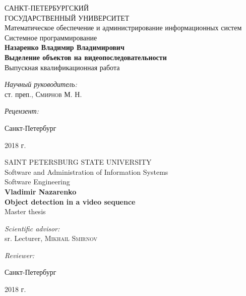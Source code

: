 \documentclass[aps,%
14pt,%
final,%
oneside,
onecolumn,%
musixtex, %
superscriptaddress,%
centertags]{extarticle} %
\begin{document}
\begin{titlepage} 
\begin{center}
{\large САНКТ-ПЕТЕРБУРГСКИЙ \\ ГОСУДАРСТВЕННЫЙ УНИВЕРСИТЕТ} \\[1.0cm]
{\large Математическое обеспечение и администрирование информационных систем} \\[0.2cm]
{\large Системное программирование} \\[3.5cm]
 
\textbf{\Large Назаренко Владимир Владимирович} \\[1cm]
\textbf{\LARGE Выделение объектов на видеопоследовательности}\\[1.0cm]
{\Large Выпускная квалификационная работа} \\[3.5cm]

\begin{flushright} \large
\emph{Научный руководитель:} \\
ст. преп., \textsc{Смирнов М. Н.}
\end{flushright}
 \begin{flushright} \large
\emph{Рецензент:} \\

\end{flushright}
\vfill 

{\large {Санкт-Петербург}} \par
{\large {2018 г.}}
\end{center} 
\end{titlepage}

\begin{titlepage} 
\begin{center}
{\large SAINT PETERSBURG STATE UNIVERSITY} \\[1.0cm]
{\large Software and Administration of Information Systems} \\[0.2cm]
{\large Software Engineering} \\[3.5cm]
 
\textbf{\Large Vladimir Nazarenko} \\[1cm]
\textbf{\LARGE Object detection in a video sequence}\\[1.0cm]
{\Large Master thesis} \\[3.5cm]

\begin{flushright} \large
\emph{Scientific advisor:} \\
sr. Lecturer, \textsc{Mikhail Smirnov}
\end{flushright}
 \begin{flushright} \large
\emph{Reviewer:} \\

\end{flushright}
\vfill 

{\large {Санкт-Петербург}} \par
{\large {2018 г.}}
\end{center} 
\end{titlepage}
\end{document}
